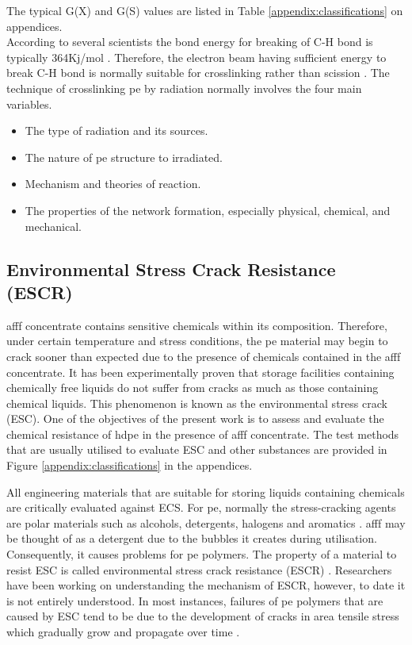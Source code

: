 The typical G(X) and G(S) values are listed in Table \ref{appendix:classifications} on appendices. \\

According to several scientists the bond energy for breaking of C-H bond is typically 364Kj/mol \cite{peacock2000handbook}. Therefore, the electron beam having sufficient energy to break C-H bond is normally suitable for crosslinking rather than scission \cite{peacock2000handbook}. The technique of crosslinking \acrshort{pe} by radiation normally involves the four main variables. 

\begin{itemize}
    \item The type of radiation and its sources.
    \item The nature of \acrshort{pe} structure to irradiated.
    \item Mechanism and theories of reaction.
    \item The properties of the network formation, especially physical, chemical, and mechanical. 
\end{itemize}

\subsection{Environmental Stress Crack Resistance (ESCR)}
\acrshort{afff} concentrate contains sensitive chemicals within its composition. Therefore, under certain temperature and stress conditions, the \acrshort{pe} material may begin to crack sooner than expected due to the presence of chemicals contained in the \acrshort{afff} concentrate. It has been experimentally proven that storage facilities containing chemically free liquids do not suffer from cracks as much as those containing chemical liquids. This phenomenon is known as the environmental stress crack (ESC). One of the objectives of the present work is to assess and evaluate the chemical resistance of \acrshort{hdpe} in the presence of \acrshort{afff} concentrate. The test methods that are usually utilised to evaluate ESC and other substances are provided in Figure \ref{appendix:classifications} in the appendices. 

All engineering materials that are suitable for storing liquids containing chemicals are critically evaluated against ECS. For \acrshort{pe}, normally the stress-cracking agents are polar materials such as alcohols, detergents, halogens and aromatics \cite{gabriel1998history}. \acrshort{afff} may be thought of as a detergent due to the bubbles it creates during utilisation. Consequently, it causes problems for \acrshort{pe} polymers. The property of a material to resist ESC is called environmental stress crack resistance (ESCR) \cite{gabriel1998history}. Researchers have been working on understanding the mechanism of ESCR, however, to date it is not entirely understood. In most instances, failures of \acrshort{pe} polymers that are caused by ESC tend to be due to the development of cracks in area tensile stress which gradually grow and propagate over time \cite{peacock2000handbook}.

